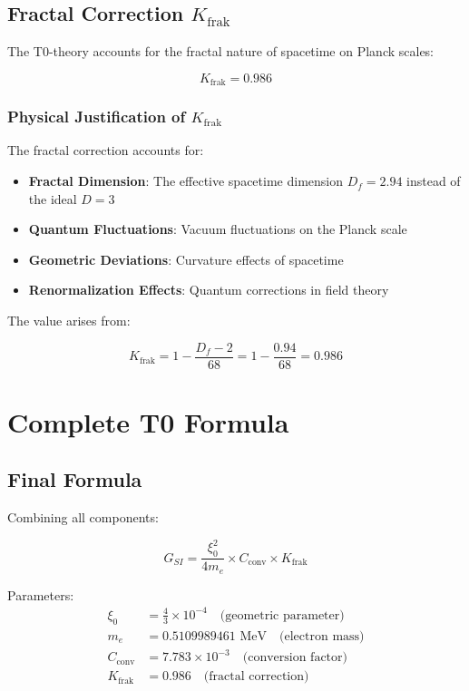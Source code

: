 \documentclass[12pt,a4paper]{article}
\newcommand{\Kfrak}{K_{\text{frak}}}
\newcommand{\Cconv}{C_{\text{conv}}}
\begin{document}
	\subsection{Fractal Correction $\Kfrak$}
	
	The T0-theory accounts for the fractal nature of spacetime on Planck scales:
	
	\begin{equation}
		\Kfrak = 0.986
	\end{equation}
	
	\subsubsection{Physical Justification of $\Kfrak$}
	
	The fractal correction accounts for:
	
	\begin{itemize}
		\item \textbf{Fractal Dimension}: The effective spacetime dimension $D_f = 2.94$ instead of the ideal $D = 3$
		\item \textbf{Quantum Fluctuations}: Vacuum fluctuations on the Planck scale
		\item \textbf{Geometric Deviations}: Curvature effects of spacetime
		\item \textbf{Renormalization Effects}: Quantum corrections in field theory
	\end{itemize}
	
	The value arises from:
	
	\begin{equation}
		\Kfrak = 1 - \frac{D_f - 2}{68} = 1 - \frac{0.94}{68} = 0.986
	\end{equation}
	
	\section{Complete T0 Formula}
	
	\subsection{Final Formula}
	
	Combining all components:
	
	\begin{correct}
		\begin{equation}
			\boxed{G_{SI} = \frac{\xi_0^2}{4 m_e} \times \Cconv \times \Kfrak}
			\label{eq:g_complete}
		\end{equation}
		
		Parameters:
		\begin{align}
			\xi_0 &= \frac{4}{3} \times 10^{-4} \quad \text{(geometric parameter)} \\
			m_e &= 0.5109989461 \text{ MeV} \quad \text{(electron mass)} \\
			\Cconv &= 7.783 \times 10^{-3} \quad \text{(conversion factor)} \\
			\Kfrak &= 0.986 \quad \text{(fractal correction)}
		\end{align}
	\end{correct}
	
\end{document}
